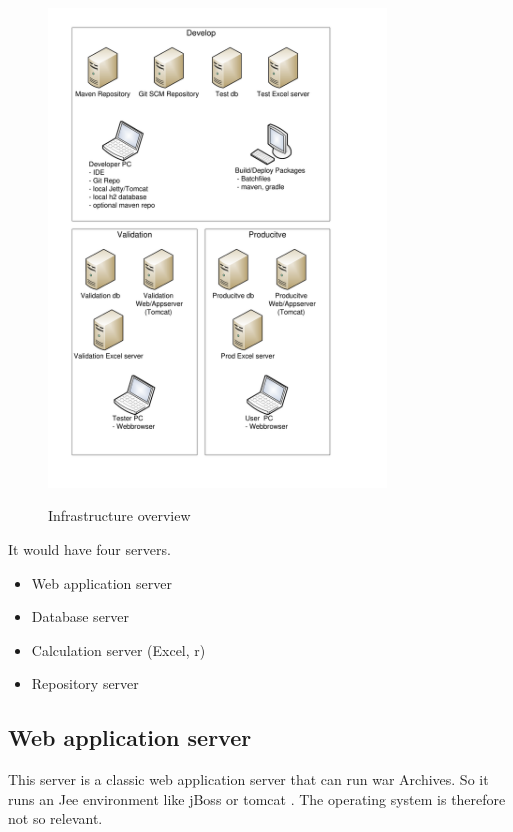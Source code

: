 \documentclass[paper=a4,twoside=false,BCOR=0mm,DIV=calc,fontsize=12pt]{scrartcl}
\begin{document}
\begin{figure}
    \begin{center}
       \includegraphics[width=0.8\textwidth]{./img/InfrastructureLayout.pdf}\\
    \end{center}
  \caption{Infrastructure overview}
  \label{infrastructureoverview}
\end{figure} 

It would have four servers. 
\begin{itemize}
 \item Web application server
 \item Database server
 \item Calculation server (Excel, r)
 \item Repository server
\end{itemize}

\subsection{Web application server}
This server is a classic web application server that can run war Archives. 
So it runs an Jee environment like jBoss \cite{jboss} or tomcat \cite{tomcat}.
The operating system is therefore not so relevant. 
\end{document}
